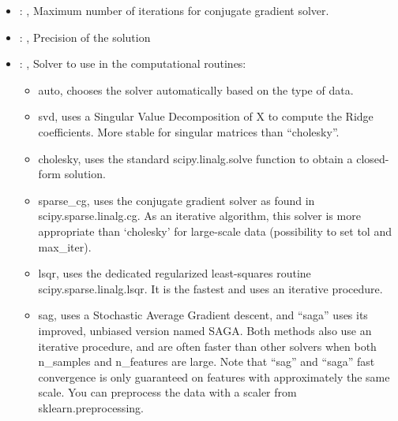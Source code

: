 \begin{itemize}
    \item {}: , 
      Maximum number of iterations for conjugate gradient solver.

    \item {}: , 
      Precision of the solution

    \item {}: , 
      Solver to use in the computational routines:
      \begin{itemize}                                                    \item auto, chooses the
      solver automatically based on the type of data.
      \item svd, uses a Singular Value Decomposition of X to compute the Ridge coefficients. More
      stable for singular                                                                matrices
      than ``cholesky''.                                                    \item cholesky, uses the
      standard scipy.linalg.solve function to obtain a closed-form solution.
      \item sparse\_cg, uses the conjugate gradient solver as found in scipy.sparse.linalg.cg. As an
      iterative algorithm,                                                               this solver
      is more appropriate than ‘cholesky’ for large-scale data (possibility to set tol and
      max\_iter).                                                    \item lsqr, uses the dedicated
      regularized least-squares routine scipy.sparse.linalg.lsqr. It is the fastest and uses
      an iterative procedure.                                                    \item sag, uses a
      Stochastic Average Gradient descent, and ``saga'' uses its improved, unbiased version named
      SAGA.                                                               Both methods also use an
      iterative procedure, and are often faster than other solvers when both
      n\_samples and n\_features are large. Note that ``sag'' and ``saga'' fast convergence is only
      guaranteed on                                                               features with
      approximately the same scale. You can preprocess the data with a scaler from
      sklearn.preprocessing.                                                  \end{itemize}


\end{itemize}
